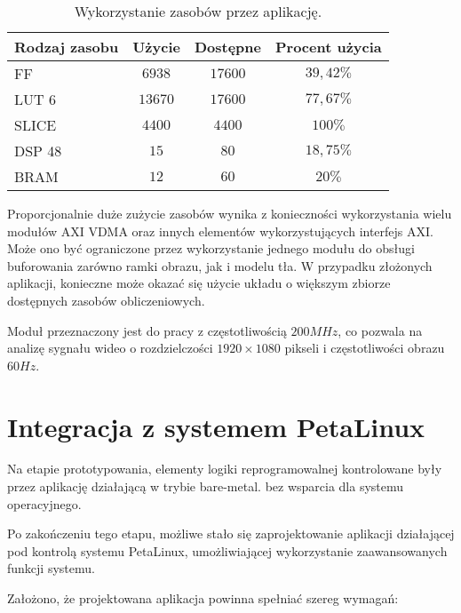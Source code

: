 \begin{table}[h]
	\caption{Wykorzystanie zasobów przez aplikację.}
	\centering
	\label{tab;background-model-utilization}
	\begin{tabular}{|l|c|c|c|}
		\hline
		\textbf{Rodzaj zasobu} & \textbf{Użycie} & \textbf{Dostępne} & \textbf{Procent użycia}      \\ \hline
		FF                     & $6938$            & $17600$             & $39,42\%$                 \\ \hline
		LUT 6                  & $13670$            & $17600$             & $77,67\%$                 \\ \hline
		SLICE                  & $4400$            & $4400$             & $100\%$                 \\ \hline
		DSP 48                 & $15$               & $80$                & $18,75\%$                    \\ \hline
		BRAM                   & $12$               & $60$                & $20\%$                   \\ \hline
	\end{tabular}
\end{table}

Proporcjonalnie duże zużycie zasobów wynika z konieczności wykorzystania wielu modułów AXI VDMA oraz innych elementów wykorzystujących interfejs AXI. Może ono być ograniczone przez wykorzystanie jednego modułu do obsługi buforowania zarówno ramki obrazu, jak i modelu tła. W przypadku złożonych aplikacji, konieczne może okazać się użycie układu o większym zbiorze dostępnych zasobów obliczeniowych.

Moduł przeznaczony jest do pracy z częstotliwością $200MHz$, co pozwala na analizę sygnału wideo o rozdzielczości $1920 \times 1080$ pikseli i częstotliwości obrazu $60Hz$.
\section{Integracja z systemem PetaLinux}
Na etapie prototypowania, elementy logiki reprogramowalnej kontrolowane były przez aplikację działającą w trybie bare-metal. bez wsparcia dla systemu operacyjnego.

Po zakończeniu tego etapu, możliwe stało się zaprojektowanie aplikacji działającej pod kontrolą systemu PetaLinux, umożliwiającej wykorzystanie zaawansowanych funkcji systemu.

Założono, że projektowana aplikacja powinna spełniać szereg wymagań:

